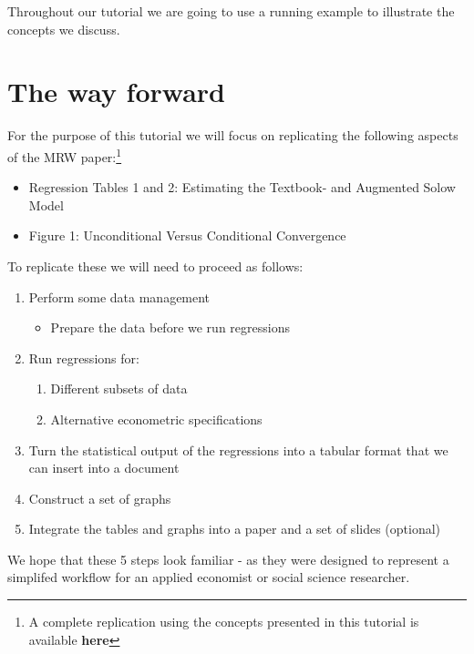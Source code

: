 \documentclass[]{book}
\providecommand{\tightlist}{%
  \setlength{\itemsep}{0pt}\setlength{\parskip}{0pt}}
\let\rmarkdownfootnote\footnote%
\def\footnote{\protect\rmarkdownfootnote}
\theoremstyle{definition}
\theoremstyle{definition}
\theoremstyle{definition}
\theoremstyle{remark}
\begin{document}
Throughout our tutorial we are going to use a running example to
illustrate the concepts we discuss.

\section{The way forward}\label{the-way-forward}

For the purpose of this tutorial we will focus on replicating the
following aspects of the MRW paper:\footnote{A complete replication
  using the concepts presented in this tutorial is available
  \textbf{here}}

\begin{itemize}
\tightlist
\item
  Regression Tables 1 and 2: Estimating the Textbook- and Augmented
  Solow Model
\item
  Figure 1: Unconditional Versus Conditional Convergence
\end{itemize}

To replicate these we will need to proceed as follows:

\begin{enumerate}
\def\labelenumi{\arabic{enumi}.}
\tightlist
\item
  Perform some data management

  \begin{itemize}
  \tightlist
  \item
    Prepare the data before we run regressions
  \end{itemize}
\item
  Run regressions for:

  \begin{enumerate}
  \def\labelenumii{\arabic{enumii}.}
  \tightlist
  \item
    Different subsets of data
  \item
    Alternative econometric specifications
  \end{enumerate}
\item
  Turn the statistical output of the regressions into a tabular format
  that we can insert into a document
\item
  Construct a set of graphs
\item
  Integrate the tables and graphs into a paper and a set of slides
  (optional)
\end{enumerate}

We hope that these 5 steps look familiar - as they were designed to
represent a simplifed workflow for an applied economist or social
science researcher.
\end{document}
